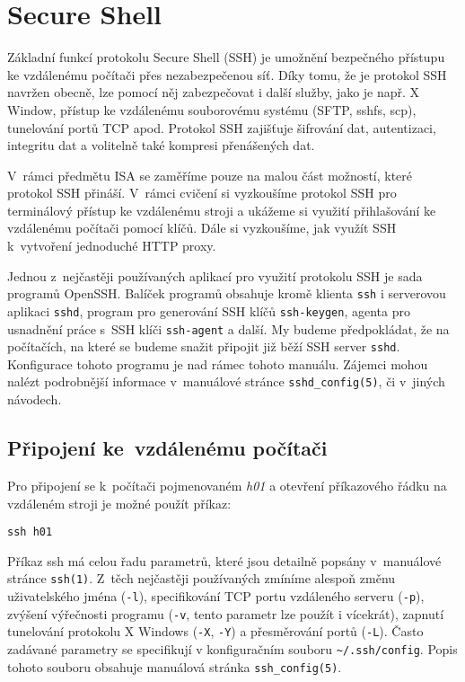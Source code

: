 \section{Secure Shell}
\label{ssh}

Základní funkcí protokolu Secure Shell (SSH) \cite{rfc4253} je umožnění bezpečného přístupu
 ke vzdálenému počítači přes nezabezpečenou síť. Díky tomu, že je protokol SSH navržen obecně,
 lze pomocí něj zabezpečovat i další služby, jako je např. X Window, přístup ke vzdálenému
 souborovému systému (SFTP, sshfs, scp), tunelování portů TCP apod. Protokol SSH zajišťuje
 šifrování dat, autentizaci, integritu dat a volitelně také kompresi přenášených dat.

V~rámci předmětu ISA se zaměříme pouze na malou část možností, které protokol SSH přináší. V~rámci
 cvičení si vyzkoušíme protokol SSH pro terminálový přístup ke vzdálenému stroji a ukážeme si
 využití přihlašování ke vzdálenému počítači pomocí klíčů. Dále si vyzkoušíme, jak využít SSH
 k~vytvoření jednoduché HTTP proxy.

Jednou z~nejčastěji používaných aplikací pro využití protokolu SSH je sada programů OpenSSH.
 Balíček programů obsahuje kromě klienta {\tt ssh} i serverovou aplikaci {\tt sshd}, program
 pro generování SSH klíčů {\tt ssh-keygen}, agenta pro usnadnění práce s~SSH klíči {\tt ssh-agent}
 a další. My budeme předpokládat, že na počítačích, na které se budeme snažit připojit
 již běží SSH server {\tt sshd}. Konfigurace tohoto programu je nad rámec tohoto manuálu. Zájemci
 mohou nalézt podrobnější informace v~manuálové stránce {\tt sshd\_config(5)}, či v~jiných návodech.

\subsection{Připojení ke~vzdálenému počítači}

Pro připojení se k~počítači pojmenovaném \emph{h01} a otevření příkazového řádku na vzdáleném
 stroji je možné použít příkaz:

\begin{verbatim}
ssh h01
\end{verbatim}

Příkaz ssh má celou řadu parametrů, které jsou detailně popsány v~manuálové stránce {\tt ssh(1)}.
 Z~těch nejčastěji používaných zmíníme alespoň změnu uživatelského jména ({\tt -l}), specifikování
 TCP portu vzdáleného serveru ({\tt -p}), zvýšení výřečnosti programu ({\tt -v}, tento parametr
 lze použít i vícekrát), zapnutí tunelování protokolu X Windows ({\tt -X}, {\tt -Y})
 a přesměrování portů ({\tt -L}). Často zadávané parametry se specifikují v konfiguračním souboru
 \verb|~/.ssh/config|. Popis tohoto souboru obsahuje manuálová stránka {\tt ssh\_config(5)}.

